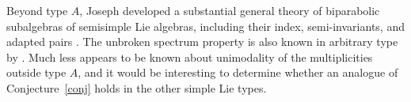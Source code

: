 \documentclass{amsart}
\theoremstyle{definition}
\begin{document}
Beyond type $A$, Joseph developed a substantial general theory of biparabolic subalgebras of semisimple Lie algebras, including their index, semi-invariants, and adapted pairs \cite{joseph2006semi, joseph2007semi, joseph2015integrality}. The unbroken spectrum property is also known in arbitrary type by \cite{CameronCollHyattMagnant}. Much less appears to be known about unimodality of the multiplicities outside type $A$, and it would be interesting to determine whether an analogue of Conjecture~\ref{conj} holds in the other simple Lie types.



%
\end{document}

